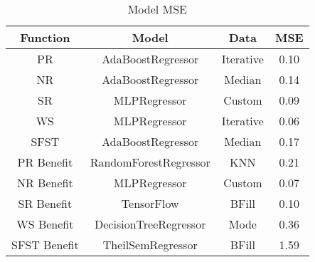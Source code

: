 \begin{table}
\centering
\begin{tabular}{|c|c|c|c|}
\hline
\textbf{Function} & \textbf{Model} & \textbf{Data} & \textbf{MSE} \\
\hline
PR & AdaBoostRegressor & Iterative & 0.10 \\
\hline
NR & AdaBoostRegressor & Median & 0.14 \\
\hline
SR & MLPRegressor & Custom & 0.09 \\
\hline
WS & MLPRegressor & Iterative & 0.06 \\
\hline
SFST & AdaBoostRegressor & Median & 0.17 \\
\hline
PR Benefit & RandomForestRegressor & KNN & 0.21 \\
\hline
NR Benefit & MLPRegressor & Custom & 0.07 \\
\hline
SR Benefit & TensorFlow & BFill & 0.10 \\
\hline
WS Benefit & DecisionTreeRegressor & Mode & 0.36 \\
\hline
SFST Benefit & TheilSemRegressor & BFill & 1.59 \\
\hline

\end{tabular}
\caption{Model MSE}
\label{tab:model_reg_specific_best}
\end{table}